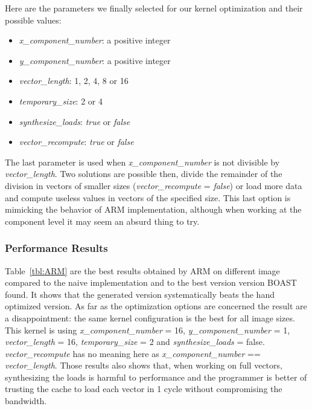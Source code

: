 \documentclass[11pt, a4paper, twoside]{montblanc}
\begin{document}
Here are the parameters we finally selected for our kernel optimization and
their possible values:
\begin{itemize}
\item \textit{x\_component\_number}: a positive integer
\item \textit{y\_component\_number}: a positive integer
\item \textit{vector\_length}: 1, 2, 4, 8 or 16
\item \textit{temporary\_size}: 2 or 4
\item \textit{synthesize\_loads}: \textit{true} or \textit{false}
\item \textit{vector\_recompute}: \textit{true} or \textit{false}
\end{itemize}
The last parameter is used when \textit{x\_component\_number} is not divisible by
\textit{vector\_length}. Two solutions are possible then, divide the remainder
of the division in vectors of smaller sizes (\textit{vector\_recompute} =
\textit{false}) or load more data and compute useless values in vectors of the
specified size. This last option is mimicking the behavior of ARM
implementation, although when working at the component level it may seem an
absurd thing to try.

    \subsubsection{Performance Results}

Table~\ref{tbl:ARM} are the best results obtained by ARM on different image
compared to the naive implementation and to the best version version BOAST
found. It shows that the generated version systematically beats the hand
optimized version. As far as the optimization options are concerned the result
are a disappointment: the same kernel configuration is the best for all image
sizes. This kernel is using \textit{x\_component\_number} = 16,
\textit{y\_component\_number} = 1, \textit{vector\_length} = 16,
\textit{temporary\_size} = 2 and \textit{synthesize\_loads} = false.
\textit{vector\_recompute} has no meaning here as \textit{x\_component\_number}
== \textit{vector\_length}. Those results also shows that, when working on full
vectors, synthesizing the loads is harmful to performance and the programmer is
better of trusting the cache to load each vector in 1 cycle without compromising
the bandwidth.
\end{document}
